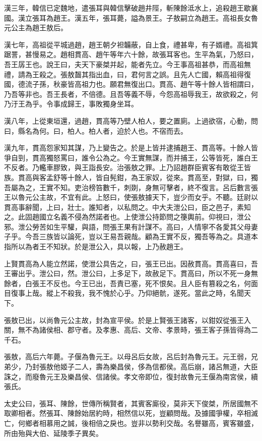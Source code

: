 漢三年，韓信已定魏地，遣張耳與韓信擊破趙井陘，斬陳餘泜水上，追殺趙王歇襄國。漢立張耳為趙王。漢五年，張耳薨，謚為景王。子敖嗣立為趙王。高祖長女魯元公主為趙王敖后。

漢七年，高祖從平城過趙，趙王朝夕袒韛蔽，自上食，禮甚卑，有子婿禮。高祖箕踞詈，甚慢易之。趙相貫高、趙午等年六十餘，故張耳客也。生平為氣，乃怒曰，吾王孱王也。說王曰，夫天下豪桀并起，能者先立。今王事高祖甚恭，而高祖無禮，請為王殺之。張敖齧其指出血，曰，君何言之誤。且先人亡國，賴高祖得復國，德流子孫，秋豪皆高祖力也。願君無復出口。貫高、趙午等十餘人皆相謂曰，乃吾等非也。吾王長者，不倍德。且吾等義不辱，今怨高祖辱我王，故欲殺之，何乃汙王為乎。令事成歸王，事敗獨身坐耳。

漢八年，上從東垣還，過趙，貫高等乃壁人柏人，要之置廁。上過欲宿，心動，問曰，縣名為何。曰，柏人。柏人者，迫於人也。不宿而去。

漢九年，貫高怨家知其謀，乃上變告之。於是上皆并逮捕趙王、貫高等。十餘人皆爭自剄，貫高獨怒罵曰，誰令公為之。今王實無謀，而并捕王，公等皆死，誰白王不反者。乃轞車膠致，與王詣長安。治張敖之罪。上乃詔趙群臣賓客有敢從王皆族。貫高與客孟舒等十餘人，皆自髡鉗，為王家奴，從來。貫高至，對獄，曰，獨吾屬為之，王實不知。吏治榜笞數千，刺剟，身無可擊者，終不復言。呂后數言張王以魯元公主故，不宜有此。上怒曰，使張敖據天下，豈少而女乎。不聽。廷尉以貫高事辭聞，上曰，壯士。誰知者，以私問之。中大夫泄公曰，臣之邑子，素知之。此固趙國立名義不侵為然諾者也。上使泄公持節問之箯輿前。仰視曰，泄公邪。泄公勞苦如生平驩，與語，問張王果有計謀不。高曰，人情寧不各愛其父母妻子乎。今吾三族皆以論死，豈以王易吾親哉。顧為王實不反，獨吾等為之。具道本指所以為者王不知狀。於是泄公入，具以報，上乃赦趙王。

上賢貫高為人能立然諾，使泄公具告之，曰，張王已出。因赦貫高。貫高喜曰，吾王審出乎。泄公曰，然。泄公曰，上多足下，故赦足下。貫高曰，所以不死一身無餘者，白張王不反也。今王已出，吾責已塞，死不恨矣。且人臣有篡殺之名，何面目復事上哉。縱上不殺我，我不愧於心乎。乃仰絕骯，遂死。當此之時，名聞天下。

張敖已出，以尚魯元公主故，封為宣平侯。於是上賢張王諸客，以鉗奴從張王入關，無不為諸侯相、郡守者。及孝惠、高后、文帝、孝景時，張王客子孫皆得為二千石。

張敖，高后六年薨。子偃為魯元王。以母呂后女故，呂后封為魯元王。元王弱，兄弟少，乃封張敖他姬子二人，壽為樂昌侯，侈為信都侯。高后崩，諸呂無道，大臣誅之，而廢魯元王及樂昌侯、信諸侯。孝文帝即位，復封故魯元王偃為南宮侯，續張氏。

太史公曰，張耳、陳餘，世傳所稱賢者，其賓客廝役，莫非天下俊桀，所居國無不取卿相者。然張耳、陳餘始居約時，相然信以死，豈顧問哉。及據國爭權，卒相滅亡，何鄉者相慕用之誠，後相倍之戾也。豈非以勢利交哉。名譽雖高，賓客雖盛，所由殆與大伯、延陵季子異矣。